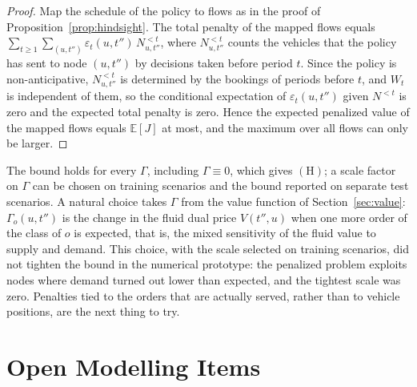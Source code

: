 \documentclass[12pt]{article}
\theoremstyle{plain}
\theoremstyle{definition}
\begin{document}
\begin{proof}
Map the schedule of the policy to flows as in the proof of Proposition~\ref{prop:hindsight}. The total penalty of the mapped flows equals $\sum_{t\ge1}\sum_{(u,t'')}\varepsilon_t(u,t'')\,N^{<t}_{u,t''}$, where $N^{<t}_{u,t''}$ counts the vehicles that the policy has sent to node $(u,t'')$ by decisions taken before period $t$. Since the policy is non-anticipative, $N^{<t}_{u,t''}$ is determined by the bookings of periods before $t$, and $W_t$ is independent of them, so the conditional expectation of $\varepsilon_t(u,t'')$ given $N^{<t}$ is zero and the expected total penalty is zero. Hence the expected penalized value of the mapped flows equals $\mathbb{E}[J]$ at most, and the maximum over all flows can only be larger.
\end{proof}

The bound holds for every $\Gamma$, including $\Gamma\equiv0$, which gives $(\mathrm{H})$; a scale factor on $\Gamma$ can be chosen on training scenarios and the bound reported on separate test scenarios. A natural choice takes $\Gamma$ from the value function of Section~\ref{sec:value}: $\Gamma_o(u,t'')$ is the change in the fluid dual price $V(t'',u)$ when one more order of the class of $o$ is expected, that is, the mixed sensitivity of the fluid value to supply and demand. This choice, with the scale selected on training scenarios, did not tighten the bound in the numerical prototype: the penalized problem exploits nodes where demand turned out lower than expected, and the tightest scale was zero. Penalties tied to the orders that are actually served, rather than to vehicle positions, are the next thing to try.

\section{Open Modelling Items}\label{sec:open}
\end{document}
